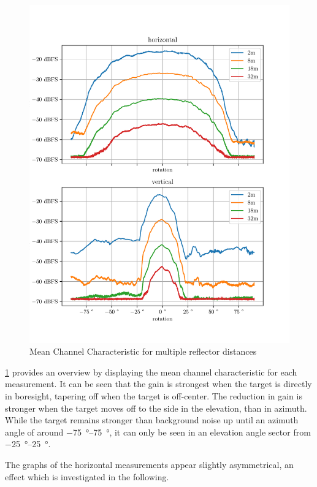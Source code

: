 \begin{figure}
  \centering
  \includegraphics[width=\textwidth]{../figures/mean_amp.pdf}
  \caption{Mean Channel Characteristic for multiple reflector distances}
  \label{fig:mean_amp}
\end{figure}

\cref{fig:mean_amp} provides an overview by displaying the mean channel characteristic for each measurement.
It can be seen that the gain is strongest when the target is directly in boresight,
tapering off when the target is off-center. The reduction in gain is stronger when the target
moves off to the side in the elevation, than in azimuth. While the target remains stronger
than background noise up until an azimuth angle of around \SIrange{-75}{+75}{\degree},
it can only be seen in an elevation angle sector from \SIrange{-25}{+25}{\degree}.

The graphs of the horizontal measurements appear slightly asymmetrical, an effect which is investigated in the following.

